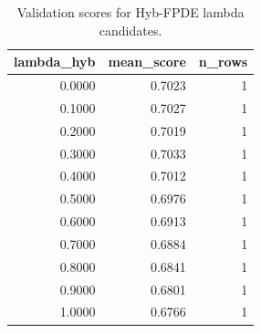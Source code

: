 \begin{table}[t]
\caption{Validation scores for Hyb-FPDE lambda candidates.}
\label{tab:lambda_distribution_computed}
\centering
\begin{tabular}{rrr}
\toprule
lambda\_hyb & mean\_score & n\_rows \\
\midrule
0.0000 & 0.7023 & 1 \\
0.1000 & 0.7027 & 1 \\
0.2000 & 0.7019 & 1 \\
0.3000 & 0.7033 & 1 \\
0.4000 & 0.7012 & 1 \\
0.5000 & 0.6976 & 1 \\
0.6000 & 0.6913 & 1 \\
0.7000 & 0.6884 & 1 \\
0.8000 & 0.6841 & 1 \\
0.9000 & 0.6801 & 1 \\
1.0000 & 0.6766 & 1 \\
\bottomrule
\end{tabular}

\end{table}
